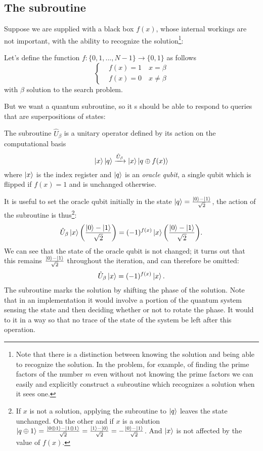 \subsection{The subroutine}\label{sec:subroutine}
Suppose we are supplied with a black box $f(x)$, whose internal workings are not important, with the ability to recognize the solution\footnote{Note that there is a distinction between knowing the solution and being able to recognize the solution. In the problem, for example, of finding the prime factors of the number $m$ even without not knowing the prime factors we can easily and explicitly construct a subroutine which recognizes a solution when it sees one.}:
\begin{defn}
Let's define the function $f: \{0,1,...,N-1\} \rightarrow \{0,1\}$ as follows
\begin{equation*}
    \begin{cases}
&f(x) = 1   \quad  x=\beta \\
&f(x) = 0   \quad x\neq\beta
\end{cases}
\end{equation*}
with $\beta$ solution to the search problem.
\end{defn}
But we want a quantum subroutine, so it s should be able to respond to queries that are superpositions of states:
\begin{defn}
The subroutine $\hat{U}_\beta$ is a unitary operator defined by its action on the computational basis
\begin{equation*}
    \ket{x}\ket{q} \xrightarrow{\hat{U}_\beta} \ket{x} \ket{q \oplus f(x)}
\end{equation*}
where $\ket{x}$ is the index register and $\ket{q}$ is an \emph{oracle qubit}, a single qubit which is flipped if $f(x) = 1$ and is unchanged otherwise.
\end{defn}

It is useful to set the oracle qubit initially in the state $\ket{q} = \frac{\ket{0}-\ket{1}}{\sqrt{2}}$, the action of the subroutine is thus\footnote{If $x$ is not a solution, applying the subroutine to $\ket{q}$ leaves the state unchanged. On the other and if $x$ is a solution $\ket{q \oplus 1} = \frac{\ket{0 \oplus 1} - \ket{1 \oplus 1}}{\sqrt{2}} = \frac{\ket{1}-\ket{0}}{\sqrt{2}} = - \frac{\ket{0}-\ket{1}}{\sqrt{2}}$. And $\ket{x}$ is not affected by the value of $f(x)$.}:
\begin{equation*}
    \hat{U}_\beta \ket{x} \biggl(\frac{\ket{0}-\ket{1}}{\sqrt{2}}\biggr) = (-1)^{f(x)} \ket{x} \biggl(\frac{\ket{0}-\ket{1}}{\sqrt{2}}\biggr).
\end{equation*}
We can see that the state of the oracle qubit is not changed; it turns out that this remains  $\frac{\ket{0}-\ket{1}}{\sqrt{2}}$ throughout the iteration, and can therefore be omitted:
\begin{equation*}
    \hat{U}_\beta \ket{x} = (-1)^{f(x)} \ket{x}.
\end{equation*}
The subroutine marks the solution by shifting the phase of the solution. Note that in an implementation it would involve a portion of the quantum system sensing the state and then deciding whether or not to rotate the phase. It would to it in a way so that no trace of the state of the system be left after this operation.
